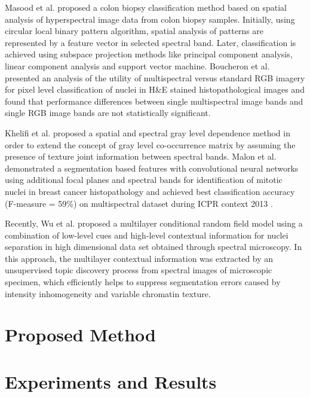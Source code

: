 \documentclass[10pt,twocolumn,letterpaper]{article}
\begin{document}
Masood et al. \cite{masood2009} proposed a colon biopsy classification method based on spatial analysis of hyperspectral image data from colon biopsy samples. Initially, using circular local binary pattern algorithm, spatial analysis of patterns are represented by a feature vector in selected spectral band. Later, classification is achieved using subspace projection methods like principal component analysis, linear component analysis and support vector machine. Boucheron et al. \cite{boucheron2007} presented an analysis of the utility of multispectral versus standard RGB imagery for pixel level classification of nuclei in H\&E stained histopathological images and found that performance differences between single multispectral image bands and single RGB image bands are not statistically significant. 

Khelifi et al. \cite{khelifi2012} proposed a spatial and spectral gray level dependence method in order to extend the concept of gray level co-occurrence matrix by assuming the presence of texture joint information between spectral bands. Malon et al. \cite{malon2013} demonstrated a segmentation based features with convolutional neural networks using additional focal planes and spectral bands for identification of mitotic nuclei in breast cancer histopathology and achieved best classification accuracy (F-measure = 59\%) on multispectral dataset during ICPR context 2013 \cite{roux2013}.

Recently, Wu et al. \cite{wu2012} proposed a multilayer conditional random field model using a combination of low-level cues and high-level contextual information for nuclei separation in high dimensional data set obtained through spectral microscopy. In this approach, the multilayer contextual information was extracted by an unsupervised topic discovery process from spectral images of microscopic specimen, which efficiently helps to suppress segmentation errors caused by intensity inhomogeneity and variable chromatin texture.

\section{Proposed Method}

\section{Experiments and Results}
\end{document}
